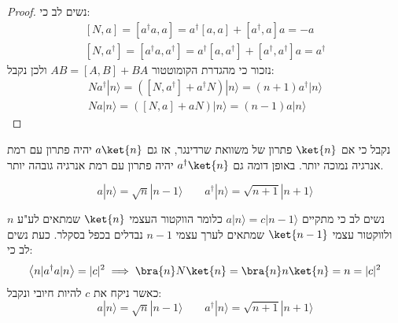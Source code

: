 \documentclass{tstextbook}
\begin{document}
\begin{proof}
נשים לב כי:
\begin{gather*}\left[N,a\right]=\left[a^{\dagger}a,a\right]=a^{\dagger}\left[a,a\right]+\left[a^{\dagger},a\right]a=-a  \\\left[ N,a^{\dagger} \right]=\left[ a^{\dagger}a,a^{\dagger} \right]=a^{\dagger}\left[ a,a^{\dagger} \right]+\left[ a^{\dagger},a^{\dagger} \right]a = a^{\dagger}
\end{gather*}
נזכור כי מהגדרת הקומוטטור \(AB=[A,B]+BA\) ולכן נקבל:
\begin{gather*}N a^{\dagger}|n\rangle=\left( \left[ N,a^{\dagger} \right]+a^{\dagger}N \right)|n\rangle=(n+1)a^{\dagger}|n\rangle  \\N a|n\rangle=([N,a]+a N)|n\rangle=(n-1)a|n\rangle
\end{gather*}

\end{proof}
\begin{remark}
נקבל כי אם \(\ket{n}\) פתרון של משוואת שרדינגר, אז גם \(a\ket{n}\) יהיה פתרון עם רמת אנרגיה נמוכה יותר. באופן דומה גם \(a^{\dagger}\ket{n}\) יהיה פתרון עם רמת אנרגיה גובהה יותר.

\end{remark}
\begin{proposition}
$$a|n\rangle=\sqrt{n}|n-1\rangle \qquad  a^{\dagger}|n\rangle=\sqrt{n+1}|n+1\rangle$$

\end{proposition}
נשים לב כי מתקיים \(a|n\rangle=c|n-1\rangle\) כלומר הווקטור העצמי \(\ket{n}\) שמתאים לע"ע \(n\) ולווקטור עצמי \(\ket{n-1}\) שמתאים לערך עצמי \(n-1\) נבדלים בכפל בסקלר. כעת נשים לב כי:
$$\left\langle  n|a^{\dagger}a|n \right\rangle=|c|^{2}\implies \bra{n} N\ket{n} =\bra{n} n\ket{n} =n=\lvert c \rvert ^2$$
כאשר ניקח את \(c\) להיות חיובי ונקבל:
$$a|n\rangle=\sqrt{n}|n-1\rangle \qquad  a^{\dagger}|n\rangle=\sqrt{n+1}|n+1\rangle$$
\end{document}
